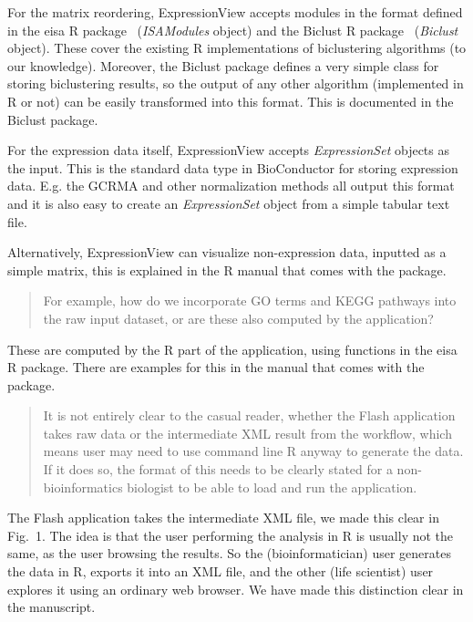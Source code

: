 \documentclass[a4paper]{article}
\newenvironment{myquote}{\begin{quote}\color{blue}}{\end{quote}}
\begin{document}
For the matrix reordering, ExpressionView accepts modules in the
format defined in the eisa R package~\citep{csardi10}
(\textit{ISAModules} object) and the
Biclust R package~\citep{kaiser08} (\textit{Biclust} object). These
cover the existing R implementations of biclustering algorithms (to our
knowledge). Moreover, the Biclust package defines a very simple class
for storing biclustering results, so the output of any other algorithm
(implemented in R or not) can be easily transformed into this
format. This is documented in the Biclust package.

For the expression data itself, ExpressionView accepts
\textit{ExpressionSet} objects as the input. This is the standard data
type in BioConductor for storing expression data. E.g. the GCRMA and
other normalization methods all output this format and it is also easy
to create an \textit{ExpressionSet} object from a simple tabular text
file.

Alternatively, ExpressionView can visualize non-expression data,
inputted as a simple matrix, this is explained in the R manual that
comes with the package.

\begin{myquote}
For example, how do we incorporate GO terms and
KEGG pathways into the raw input dataset, or are these also computed
by the application? 
\end{myquote}

These are computed by the R part of the application, using functions
in the eisa R package. There are examples for this in the manual that
comes with the package.

\begin{myquote}
It is not entirely clear to the casual reader,
whether the Flash application takes raw data or the intermediate XML
result from the workflow, which means user may need to use command
line R anyway to generate the data. If it does so, the format of this
needs to be clearly stated for a non-bioinformatics biologist to be
able to load and run the application. 
\end{myquote}

The Flash application takes the intermediate XML file, we made this
clear in Fig.~1. The idea is that the user performing the analysis in
R is usually not the same, as the user browsing the results. So the
(bioinformatician) user generates the data in R, exports it into an
XML file, and the other (life scientist) user explores it using an
ordinary web browser. We have made this distinction clear in the
manuscript.
\end{document}
